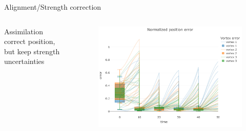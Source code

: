 \documentclass[aspectratio=169]{beamer} %
\begin{document}
\begin{frame}{Alignment/Strength correction}
    \vspace{-0.5cm}
    \begin{columns}
        \begin{column}{0.5\textwidth}
            \begin{figure}
                \centering
            \end{figure}
            Assimilation correct position, but keep strength uncertainties
        \end{column}
        \begin{column}{0.5\textwidth}

            \begin{figure}

                \centering
                \includegraphics[width=\textwidth]{images/error_position_w_assim.pdf}
            \end{figure}
        \end{column}
    \end{columns}
\end{frame}

\end{document}
